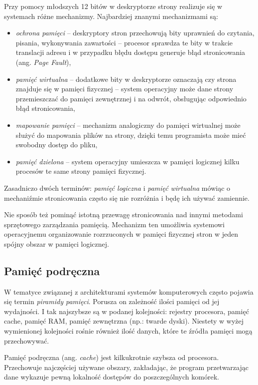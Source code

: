 \documentclass[12pt,a4paper,titlepage,twoside]{mwart}
\begin{document}
Przy pomocy młodszych 12 bitów w deskryptorze strony realizuje się w systemach
różne mechanizmy. Najbardziej znanymi mechanizmami są:
\begin{itemize}
\item \textit{ochrona pamięci} -- deskryptory stron przechowują bity uprawnień do
czytania, pisania, wykonywania zawartości -- procesor sprawdza te bity w
trakcie translacji adresu i w przypadku błędu dostępu generuje błąd
stronicowania (ang. \textit{Page Fault}),
\item \textit{pamięć wirtualna} -- dodatkowe bity w deskryptorze oznaczają czy
strona znajduje się w pamięci fizycznej -- system operacyjny może dane strony
przemieszczać do pamięci zewnętrznej i na odwrót, obsługując odpowiednio błąd
stronicowania,
\item \textit{mapowanie pamięci} -- mechanizm analogiczny do pamięci wirtualnej
może służyć do mapowania plików na strony, dzięki temu programista może mieć
swobodny dostęp do pliku,
\item \textit{pamięć dzielona} -- system operacyjny umieszcza w pamięci logicznej kilku
procesów te same strony pamięci fizycznej.
\end{itemize}

Zasadniczo dwóch terminów: \textit{pamięć logiczna} i \textit{pamięć wirtualna}
mówiąc o mechaniźmie stronicowania często się nie rozróżnia i będę ich używać
zamiennie.

Nie sposób też pominąć istotną przewagę stronicowania nad innymi metodami
sprzętowego zarządzania pamięcią. Mechanizm ten umożliwia systemowi
operacyjnemu organizowanie rozrzuconych w pamięci fizycznej stron w jeden
spójny obszar w pamięci logicznej.

\subsection{Pamięć podręczna}

W tematyce związanej z architekturami systemów komputerowych często pojawia się
termin \textit{piramidy pamięci}. Porusza on zależność ilości pamięci od jej
wydajności. I tak najszybsze są w podanej kolejności: rejestry procesora,
pamięć cache, pamięć RAM, pamięć zewnętrzna (np.: twarde dyski). Niestety w
wyżej wymienionej kolejności rośnie również ilość danych, które te źródła
pamięci mogą przechowywać.

Pamięć podręczna (ang. \textit{cache}) jest kilkukrotnie szybsza od procesora.
Przechowuje najczęściej używane obszary, zakładając, że program przetwarzając
dane wykazuje pewną lokalność dostępów do poszczególnych komórek.
\end{document}
